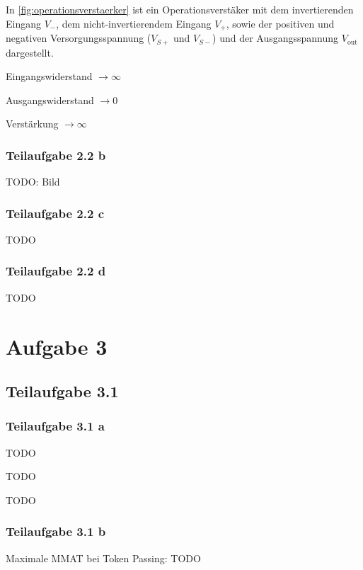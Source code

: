 \documentclass[a4paper]{scrartcl}
\begin{document}
  In \cref{fig:operationsverstaerker} ist ein Operationsverstäker mit dem
  invertierenden Eingang $V_{-}$, dem nicht-invertierendem Eingang $V_{+}$,
  sowie der positiven und negativen Versorgungsspannung ($V_{S+}$ und $V_{S-}$)
  und der Ausgangsspannung $V_{\text{out}}$ dargestellt.\\
  \begin{enumerate*}[label=(\roman*)]
      \item Eingangswiderstand $\rightarrow \infty$
      \item Ausgangswiderstand $\rightarrow 0$
      \item Verstärkung $\rightarrow \infty$
  \end{enumerate*}

  \subsubsection*{Teilaufgabe 2.2 b}
  TODO: Bild

  \subsubsection*{Teilaufgabe 2.2 c}
  TODO

  \subsubsection*{Teilaufgabe 2.2 d}
  TODO

  \section*{Aufgabe 3}
  \subsection*{Teilaufgabe 3.1}
  \subsubsection*{Teilaufgabe 3.1 a}
  \begin{enumerate*}[label=(\arabic*)]
      \item TODO
      \item TODO
      \item TODO
  \end{enumerate*}

  \subsubsection*{Teilaufgabe 3.1 b}
  Maximale MMAT bei Token Passing: TODO
\end{document}
